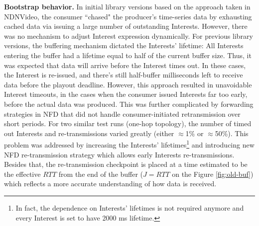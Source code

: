 \documentclass{icn/sig-alternate-2013} %
\begin{document}

%
%

\textbf{Bootstrap behavior.} In initial library versions based on the approach taken in NDNVideo, the consumer ``chased" the producer's time-series data by exhausting cached data via issuing a large number of outstanding Interests. However, there was no mechanism to adjust Interest expression dynamically. %
For previous library versions, the buffering mechanism dictated the Interests' lifetime: All Interests entering the buffer had a lifetime equal to half of the current buffer size. Thus, it was expected that data will arrive before the Interest times out. In these cases, the Interest is re-issued, and there's still half-buffer milliseconds left to receive data before the playout deadline.
However, this approach resulted in unavoidable Interest timeouts, in the cases when the consumer issued Interests far too early, before the actual data was produced.  This was further complicated by forwarding strategies in NFD that did not handle consumer-initiated retransmission over short periods. 
For two similar test runs (one-hop topology), the number of timed out Interests and re-transmissions varied greatly (either $\approx$1\% or $\approx$50\%). %
This problem was addressed by increasing the Interests' lifetimes\footnote{In fact, the dependence on Interests' lifetimes is not required anymore and every Interest is set to have 2000 ms lifetime.} and introducing new NFD re-transmission strategy which allows early Interests re-transmissions. 
Besides that, the re-transmission checkpoint is placed at a time estimated to be the effective $RTT$ from the end of the buffer ($J=RTT$ on the Figure \ref{fig:old-buf}) which reflects a more accurate understanding of how data is received.
\end{document}
